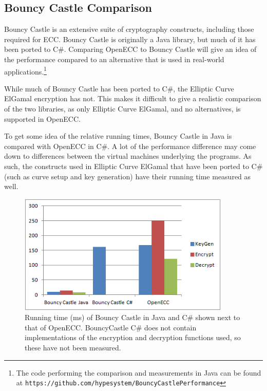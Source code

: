 \subsection{Bouncy Castle Comparison}
\label{sec:performance_bouncycastle}

Bouncy Castle is an extensive suite of cryptography constructs, including those required for ECC. Bouncy Castle is originally a
Java library, but much of it has been ported to C\#.\cite{bouncycastle} Comparing OpenECC to Bouncy Castle will give an idea of the performance
compared to an alternative that is used in real-world applications.\footnote{The code performing the comparison and measurements
in Java can be found at \texttt{https://github.com/hypesystem/BouncyCastlePerformance}}

While much of Bouncy Castle has been ported to C\#, the Elliptic Curve ElGamal encryption has not. This makes it difficult to
give a realistic comparison of the two libraries, as only Elliptic Curve ElGamal, and no alternatives, is supported in OpenECC.

To get some idea of the relative running times, Bouncy Castle in Java is compared with OpenECC in C\#. A lot of the performance
difference may come down to differences between the virtual machines underlying the programs. As such, the constructs used in
Elliptic Curve ElGamal that have been ported to C\# (such as curve setup and key generation) have their running time measured
as well.

\begin{figure}[htb!]
	\centering
	\includegraphics[width=0.9\textwidth]{performance/bouncycastle-comparison}
	\caption{Running time (ms) of Bouncy Castle in Java and C\# shown next to that of OpenECC. BouncyCastle C\# does not contain
		implementations of the encryption and decryption functions used, so these have not been measured.}
	\label{fig:bouncycastle-comparison-graph}
\end{figure}

